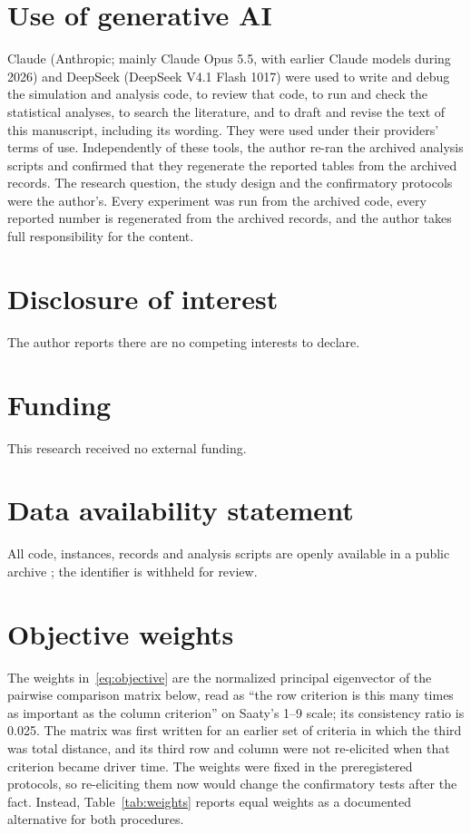 \documentclass[11pt,a4paper]{article}
\theoremstyle{remark}
\newcommand{\refsfile}{ijss_refs_anon}
\begin{document}
\section*{Use of generative AI}
Claude (Anthropic; mainly Claude Opus 5.5, with earlier Claude models during 2026)
and DeepSeek (DeepSeek V4.1 Flash 1017) were used to write and debug the
simulation and analysis code, to review that code, to run and check the statistical
analyses, to search the literature, and to draft and revise the text of this
manuscript, including its wording. They were used under their providers' terms of
use. Independently of these tools, the author re-ran the archived analysis scripts and
confirmed that they regenerate the reported tables from the archived records. The research question, the study design and the confirmatory protocols were
the author's. Every experiment was run from the archived code, every reported
number is regenerated from the archived records, and the author takes full
responsibility for the content.

\section*{Disclosure of interest}
The author reports there are no competing interests to declare.

\section*{Funding}
This research received no external funding.

\section*{Data availability statement}

All code, instances, records and analysis scripts are openly available in a public
archive \citep{ali2026archive}; the identifier is withheld for review.





\appendix
\setcounter{table}{0}
\renewcommand{\thetable}{\thesection\arabic{table}}
\section{Objective weights}\label{app:weights}

The weights in~\eqref{eq:objective} are the normalized principal eigenvector of the
pairwise comparison matrix below, read as ``the row criterion is this many times as
important as the column criterion'' on Saaty's 1--9 scale; its consistency ratio is
0.025. The matrix was first written for an earlier set of criteria in which the third
was total distance, and its third row and column were not re-elicited when that
criterion became driver time. The weights were fixed in the preregistered protocols, so
re-eliciting them now would change the confirmatory tests after the fact. Instead,
Table~\ref{tab:weights} reports equal weights as a documented alternative for both
procedures.
\end{document}
